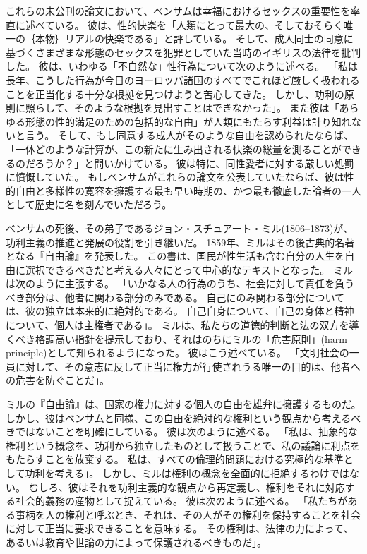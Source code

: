 \documentclass[paper=a4,book,openany]{jlreq}
\begin{document}
これらの未公刊の論文において、ベンサムは幸福におけるセックスの重要性を率直に述べている。
彼は、性的快楽を「人類にとって最大の、そしておそらく唯一の｛本物｝{リアル}の快楽である」と評している。
そして、成人同士の同意に基づくさまざまな形態のセックスを犯罪としていた当時のイギリスの法律を批判した。
彼は、いわゆる「不自然な」性行為について次のように述べる。
「私は長年、こうした行為が今日のヨーロッパ諸国のすべてでこれほど厳しく扱われることを正当化する十分な根拠を見つけようと苦心してきた。
しかし、功利の原則に照らして、そのような根拠を見出すことはできなかった」。
また彼は「あらゆる形態の性的満足のための包括的な自由」が人類にもたらす利益は計り知れないと言う。
そして、もし同意する成人がそのような自由を認められたならば、「一体どのような計算が、この新たに生み出される快楽の総量を測ることができるのだろうか？」と問いかけている。
彼は特に、同性愛者に対する厳しい処罰に憤慨していた。
もしベンサムがこれらの論文を公表していたならば、彼は性的自由と多様性の寛容を擁護する最も早い時期の、かつ最も徹底した論者の一人として歴史に名を刻んでいただろう。

ベンサムの死後、その弟子であるジョン・スチュアート・ミル(1806--1873)が、功利主義の推進と発展の役割を引き継いだ。
1859年、ミルはその後古典的名著となる『自由論』を発表した。
この書は、国民が性生活も含む自分の人生を自由に選択できるべきだと考える人々にとって中心的なテキストとなった。
ミルは次のように主張する。
「いかなる人の行為のうち、社会に対して責任を負うべき部分は、他者に関わる部分のみである。
自己にのみ関わる部分については、彼の独立は本来的に絶対的である。
自己自身について、自己の身体と精神について、個人は主権者である」\citep[p.13]{mill15:_liber_utilit_other_essay}。
ミルは、私たちの道徳的判断と法の双方を導くべき格調高い指針を提示しており、それはのちにミルの「危害原則」(harm principle)として知られるようになった。
彼はこう述べている。
「文明社会の一員に対して、その意志に反して正当に権力が行使されうる唯一の目的は、他者への危害を防ぐことだ」\citep[p.13]{mill15:_liber_utilit_other_essay}。

ミルの『自由論』は、国家の権力に対する個人の自由を雄弁に擁護するものだ。
しかし、彼はベンサムと同様、この自由を絶対的な権利という観点から考えるべきではないことを明確にしている。
彼は次のように述べる。
「私は、抽象的な権利という概念を、功利から独立したものとして扱うことで、私の議論に利点をもたらすことを放棄する。
私は、すべての倫理的問題における究極的な基準として功利を考える」\citep[p.14]{mill15:_liber_utilit_other_essay}。
しかし、ミルは権利の概念を全面的に拒絶するわけではない。
むしろ、彼はそれを功利主義的な観点から再定義し、権利をそれに対応する社会的義務の産物として捉えている。
彼は次のように述べる。
「私たちがある事柄を人の権利と呼ぶとき、それは、その人がその権利を保持することを社会に対して正当に要求できることを意味する。
その権利は、法律の力によって、あるいは教育や世論の力によって保護されるべきものだ」\citep[p.166]{mill15:_liber_utilit_other_essay}。
\end{document}
